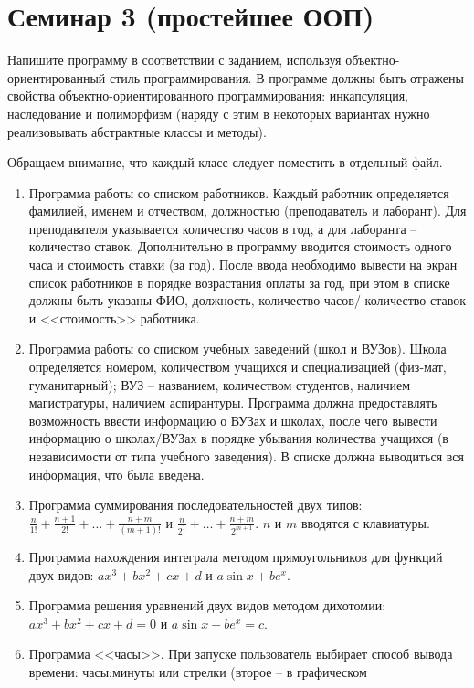 \documentclass[12pt]{article}
\begin{document}
\section{Семинар 3 (простейшее ООП)}

Напишите программу в соответствии с заданием, 
используя объектно-ориентированный стиль программирования. 
В программе должны быть отражены свойства объектно-ориентированного 
программирования: 
инкапсуляция, наследование и полиморфизм (наряду с этим в некоторых
вариантах нужно реализовывать абстрактные классы и методы). 

Обращаем внимание, что каждый класс следует поместить в отдельный файл.

\begin{enumerate}
\item Программа работы со списком работников. Каждый работник определяется фамилией, именем и отчеством, должностью 
(преподаватель и лаборант). Для преподавателя указывается количество часов в год, а для лаборанта -- количество ставок.
Дополнительно в программу вводится стоимость одного часа и стоимость ставки (за год). После ввода необходимо вывести на экран
список работников в порядке возрастания оплаты за год, при этом в списке должны быть указаны ФИО, должность, количество часов/
количество ставок и <<стоимость>> работника.
\item Программа работы со списком учебных заведений (школ и ВУЗов). Школа определяется номером, количеством
учащихся и специализацией (физ-мат, гуманитарный); ВУЗ -- названием, количеством студентов, наличием магистратуры, наличием
аспирантуры. Программа должна предоставлять возможность ввести информацию о ВУЗах и школах, после чего
вывести информацию о школах/ВУЗах в порядке убывания количества учащихся (в независимости от типа учебного заведения).
В списке должна выводиться вся информация, что была введена.
\item Программа суммирования последовательностей двух типов: $\frac{n}{1!}+\frac{n+1}{2!}+\dots+\frac{n+m}{(m+1)!}$ и
$\frac{n}{2^1}+\dots+\frac{n+m}{2^{m+1}}$. $n$ и $m$ вводятся с клавиатуры.
\item Программа нахождения интеграла методом прямоугольников для функций двух видов: $ax^3+bx^2+cx+d$ и $a\sin x+ be^x$.
\item Программа решения уравнений двух видов методом дихотомии: $ax^3+bx^2+cx+d=0$ и $a\sin x+ be^x=c$.
\item Программа <<часы>>. При запуске пользователь выбирает способ вывода времени: часы:минуты или стрелки (второе -- в графическом

\end{enumerate}
\end{document}
